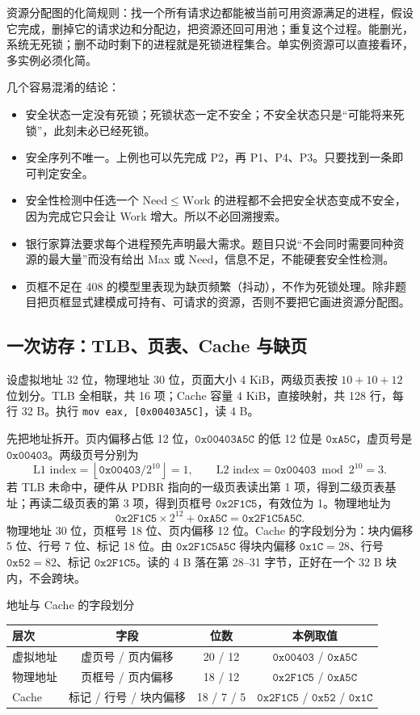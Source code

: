 资源分配图的化简规则：找一个所有请求边都能被当前可用资源满足的进程，假设它完成，删掉它的请求边和分配边，把资源还回可用池；重复这个过程。能删光，系统无死锁；删不动时剩下的进程就是死锁进程集合。单实例资源可以直接看环，多实例必须化简。

几个容易混淆的结论：

\begin{itemize}
  \item 安全状态一定没有死锁；死锁状态一定不安全；不安全状态只是“可能将来死锁”，此刻未必已经死锁。
  \item 安全序列不唯一。上例也可以先完成 P2，再 P1、P4、P3。只要找到一条即可判定安全。
  \item 安全性检测中任选一个 $\mathrm{Need}\le\mathrm{Work}$ 的进程都不会把安全状态变成不安全，因为完成它只会让 Work 增大。所以不必回溯搜索。
  \item 银行家算法要求每个进程预先声明最大需求。题目只说“不会同时需要同种资源的最大量”而没有给出 Max 或 Need，信息不足，不能硬套安全性检测。
  \item 页框不足在 408 的模型里表现为缺页频繁（抖动），不作为死锁处理。除非题目把页框显式建模成可持有、可请求的资源，否则不要把它画进资源分配图。
\end{itemize}

\subsection{一次访存：TLB、页表、Cache 与缺页}

设虚拟地址 32 位，物理地址 30 位，页面大小 4 KiB，两级页表按 $10+10+12$ 位划分。TLB 全相联，共 16 项；Cache 容量 4 KiB，直接映射，共 128 行，每行 32 B。执行 \texttt{mov eax, [0x00403A5C]}，读 4 B。

先把地址拆开。页内偏移占低 12 位，$\texttt{0x00403A5C}$ 的低 12 位是 $\texttt{0xA5C}$，虚页号是 $\texttt{0x00403}$。两级页号分别为
\[
\text{L1 index}=\left\lfloor \texttt{0x00403}/2^{10}\right\rfloor=1,\qquad
\text{L2 index}=\texttt{0x00403}\bmod 2^{10}=3.
\]
若 TLB 未命中，硬件从 PDBR 指向的一级页表读出第 1 项，得到二级页表基址；再读二级页表的第 3 项，得到页框号 $\texttt{0x2F1C5}$，有效位为 1。物理地址为
\[
\texttt{0x2F1C5}\times2^{12}+\texttt{0xA5C}=\texttt{0x2F1C5A5C}.
\]
物理地址 30 位，页框号 18 位、页内偏移 12 位。Cache 的字段划分为：块内偏移 5 位、行号 7 位、标记 18 位。由 $\texttt{0x2F1C5A5C}$ 得块内偏移 $\texttt{0x1C}=28$、行号 $\texttt{0x52}=82$、标记 $\texttt{0x2F1C5}$。读的 4 B 落在第 28--31 字节，正好在一个 32 B 块内，不会跨块。

\begin{tablebox}{地址与 Cache 的字段划分}
\centering
\small
\begin{tabular}{|l|c|c|c|}
\hline
层次 & 字段 & 位数 & 本例取值 \\
\hline
虚拟地址 & 虚页号 / 页内偏移 & 20 / 12 & $\texttt{0x00403}$ / $\texttt{0xA5C}$ \\
物理地址 & 页框号 / 页内偏移 & 18 / 12 & $\texttt{0x2F1C5}$ / $\texttt{0xA5C}$ \\
Cache & 标记 / 行号 / 块内偏移 & 18 / 7 / 5 & $\texttt{0x2F1C5}$ / $\texttt{0x52}$ / $\texttt{0x1C}$ \\
\hline
\end{tabular}
\end{tablebox}


